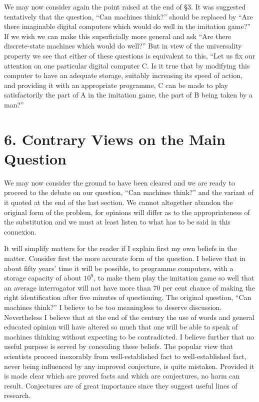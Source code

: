 \documentclass[10pt,twoside,openright]{memoir}
\begin{document}
We may now consider again the point raised at the end of \S3. It was suggested tentatively that the question, ``Can machines think?'' should be replaced by ``Are there imaginable digital computers which would do well in the imitation game?'' If we wish we can make this superficially more general and ask ``Are there discrete-state machines which would do well?'' But in view of the universality property we see that either of these questions is equivalent to this, ``Let us fix our attention on one particular digital computer C. Is it true that by modifying this computer to have an adequate storage, suitably increasing its speed of action, and providing it with an appropriate programme, C can be made to play satisfactorily the part of A in the imitation game, the part of B being taken by a man?''

\section{6. Contrary Views on the Main Question}

We may now consider the ground to have been cleared and we are ready to proceed to the debate on our question, ``Can machines think?'' and the variant of it quoted at the end of the last section. We cannot altogether abandon the original form of the problem, for opinions will differ as to the appropriateness of the substitution and we must at least listen to what has to be said in this connexion.

It will simplify matters for the reader if I explain first my own beliefs in the matter. Consider first the more accurate form of the question. I believe that in about fifty years' time it will be possible, to programme computers, with a storage capacity of about $10^9$, to make them play the imitation game so well that an average interrogator will not have more than 70 per cent chance of making the right identification after five minutes of questioning. The original question, ``Can machines think?'' I believe to be too meaningless to deserve discussion. Nevertheless I believe that at the end of the century the use of words and general educated opinion will have altered so much that one will be able to speak of machines thinking without expecting to be contradicted. I believe further that no useful purpose is served by concealing these beliefs. The popular view that scientists proceed inexorably from well-established fact to well-established fact, never being influenced by any improved conjecture, is quite mistaken. Provided it is made clear which are proved facts and which are conjectures, no harm can result. Conjectures are of great importance since they suggest useful lines of research.
\end{document}

